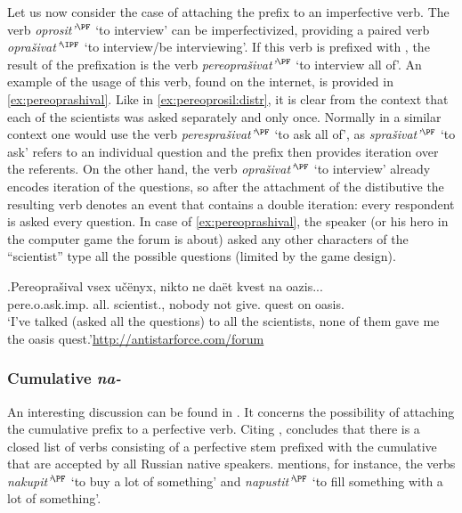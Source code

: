 Let us now consider the case of attaching the prefix  to an imperfective verb. The verb \textit{oprosit'}$^{\PF}$ `to interview' can be imperfectivized, providing a paired verb \textit{opra\v{s}ivat'}$^{\IPF}$ `to interview/be interviewing'. If this verb is prefixed with , the result of the prefixation is the verb \textit{pereopra\v{s}ivat'}$^{\PF}$ `to interview all of'. An example of the usage of this verb, found on the internet, is provided in \ref{ex:pereoprashival}. Like in \ref{ex:pereoprosil:distr}, it is clear from the context that each of the scientists was asked separately and only once. Normally in a similar context one would use the verb \textit{perespra\v{s}ivat'}$^{\PF}$ `to ask all of', as \textit{spra\v{s}ivat'}$^{\PF}$ `to ask' refers to an individual question and the prefix  then provides iteration over the referents. On the other hand, the verb \textit{opra\v{s}ivat'}$^{\PF}$ `to interview' already encodes iteration of the questions, so after the attachment of the distibutive  the resulting verb denotes an event that contains a double iteration: every respondent is asked every question. In case of \ref{ex:pereoprashival}, the speaker (or his hero in the computer game the forum is about) asked any other characters of the ``scientist'' type all the possible questions (limited by the game design).

\exg.\label{ex:pereoprashival}Pereopra\v{s}ival vsex u\v{c}\"{e}nyx, nikto ne da\"{e}t kvest na oazis...\\
pere.o.ask.imp. all. scientist., nobody not give. quest on oasis.\\
\trans `I've talked (asked all the questions) to all the scientists, none of them gave me the oasis quest.'\hbox{}\hfill\hbox{\url{http://antistarforce.com/forum}}

\subsubsection{Cumulative \textit{na-}}
An interesting discussion can be found in \citet{Tatevosov:13a}. It concerns the possibility of attaching the cumulative prefix  to a perfective verb. Citing \citet{Zaliznjak:03}, \citet{Tatevosov:13a} concludes that there is a closed list of verbs consisting of a perfective stem prefixed with the cumulative  that are accepted by all Russian native speakers. \citet{Tatevosov:13a} mentions, for instance, the verbs \textit{nakupit'}$^{\PF}$ `to buy a lot of something' and \textit{napustit'}$^{\PF}$ `to fill something with a lot of something'. 

